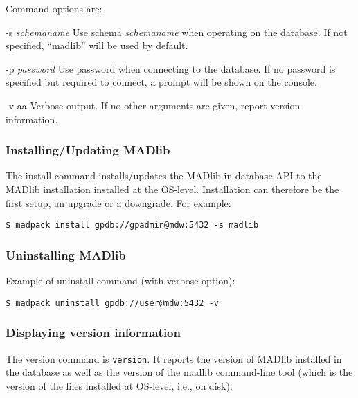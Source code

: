 \documentclass[11pt]{article}
\begin{document}
{\begin{description}
	\item Command options are:
	\begin{ttdescription}
		\item[-s \textit{schemaname}] Use schema \textit{schemaname} when operating on the database. If not specified, ``madlib'' will be used by default. 
		\item[-p \textit{password}] Use password  when connecting to the database. If no password is specified but required to connect, a prompt will be shown on the console.
		\item[-v aa] Verbose output. If no other arguments are given, report version information.
	\end{ttdescription}
\end{description}

	\subsubsection{Installing/Updating MADlib}

		The install command installs/updates the MADlib in-database API to the MADlib installation installed at the OS-level. Installation can therefore be the first setup, an upgrade or a downgrade. For example:

		\begin{lstlisting}
$ madpack install gpdb://gpadmin@mdw:5432 -s madlib
		\end{lstlisting}

	\subsubsection{Uninstalling MADlib}

		Example of uninstall command (with verbose option):

		\begin{lstlisting}
$ madpack uninstall gpdb://user@mdw:5432 -v
		\end{lstlisting}

	\subsubsection{Displaying version information}

		The version command is \texttt{version}. It reports the version of MADlib installed in the database as well as the version of the madlib command-line tool (which is the version of the files installed at OS-level, i.e., on disk).

}
\end{document}
